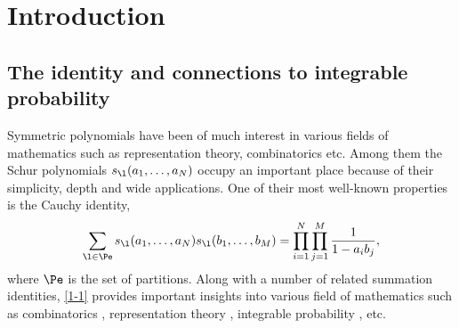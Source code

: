 \section{Introduction}
\label{s1}

\subsection{The identity and connections to integrable probability}
 Symmetric polynomials have been of much interest in various fields of mathematics such as representation theory, combinatorics etc. Among them the Schur polynomials $s_{\l}(a_1,\dots,a_N)$ occupy an important place because of their simplicity, depth and wide applications. One of their most well-known properties
 is the Cauchy identity,
\begin{align}
\label{1-1}
 \sum_{\l\in\Pe}s_{\l}(a_1,\dots,a_N)s_{\l}(b_1,\dots,b_M)
 =
 \prod_{i=1}^N\prod_{j=1}^M\frac{1}{1-a_ib_j},
\end{align}
 where $\Pe$ is the set of partitions.
 Along with a number of related summation identities, \eqref{1-1} provides important insights into various field of mathematics such as combinatorics \cite{Sagan2000symmetricgroup}, representation theory \cite{Bump2013Liegroups}, integrable probability \cite{BorodinGorin2016IntegrableProbability}, etc.

